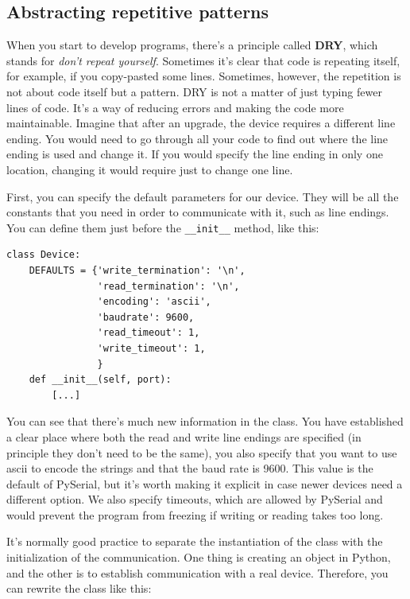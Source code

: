 \subsection{Abstracting repetitive patterns}\label{subsec:abstracting-repetitive-patterns}
When you start to develop programs, there's a principle called \textbf{DRY}, which stands for \emph{don't repeat yourself}. Sometimes it's clear that code is repeating itself, for example, if you copy-pasted some lines. Sometimes, however, the repetition is not about code itself but a pattern. {DRY} is not a matter of just typing fewer lines of code. It's a way of reducing errors and making the code more maintainable. Imagine that after an upgrade, the device requires a different line ending. You would need to go through all your code to find out where the line ending is used and change it. If you would specify the line ending in only one location, changing it would require just to change one line.

First, you can specify the default parameters for our device. They will be all the constants that you need in order to communicate with it, such as line endings. You can define them just before the \texttt{__init__} method, like this:

\begin{verbatim}
class Device:
    DEFAULTS = {'write_termination': '\n',
                'read_termination': '\n',
                'encoding': 'ascii',
                'baudrate': 9600,
                'read_timeout': 1,
                'write_timeout': 1,
                }
    def __init__(self, port):
        [...]
\end{verbatim}

You can see that there's much new information in the class. You have established a clear place where both the read and write line endings are specified (in principle they don't need to be the same), you also specify that you want to use ascii to encode the strings and that the baud rate is 9600. This value is the default of PySerial, but it's worth making it explicit in case newer devices need a different option. We also specify timeouts, which are allowed by PySerial and would prevent the program from freezing if writing or reading takes too long.

It's normally good practice to separate the instantiation of the class with the initialization of the communication. One thing is creating an object in Python, and the other is to establish communication with a real device. Therefore, you can rewrite the class like this:

